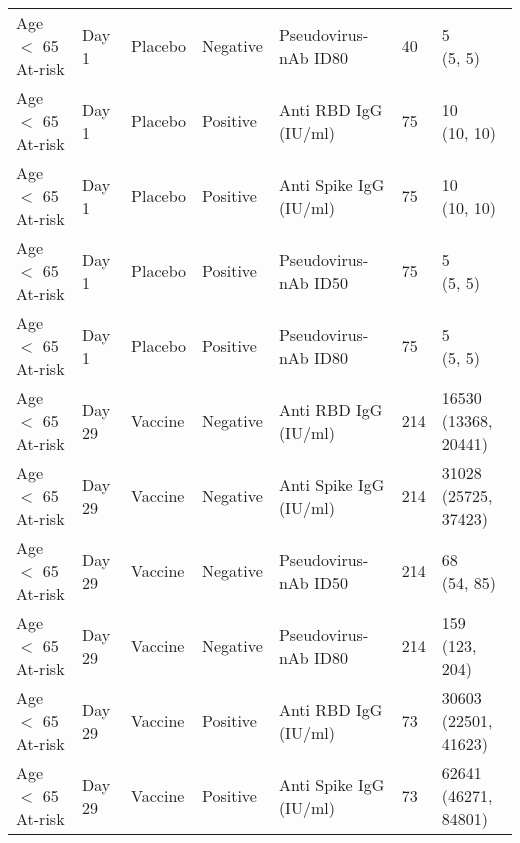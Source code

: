 \documentclass[]{book}
\theoremstyle{definition}
\theoremstyle{definition}
\theoremstyle{definition}
\newcommand{\1}{\mathbbm{1}}
\begin{document}
\begin{landscape}
\begin{ThreePartTable}
\begin{longtable}[t]{>{\raggedright\arraybackslash}p{7cm}llllll}
\hspace{1em}Age $<$ 65 At-risk & Day 1 & Placebo & Negative & Pseudovirus-nAb ID80 & 40 & \makecell[l]{5\\(5, 5)}\\
\hspace{1em}Age $<$ 65 At-risk & Day 1 & Placebo & Positive & Anti RBD IgG (IU/ml) & 75 & \makecell[l]{10\\(10, 10)}\\
\hspace{1em}Age $<$ 65 At-risk & Day 1 & Placebo & Positive & Anti Spike IgG (IU/ml) & 75 & \makecell[l]{10\\(10, 10)}\\
\hspace{1em}Age $<$ 65 At-risk & Day 1 & Placebo & Positive & Pseudovirus-nAb ID50 & 75 & \makecell[l]{5\\(5, 5)}\\
\hspace{1em}Age $<$ 65 At-risk & Day 1 & Placebo & Positive & Pseudovirus-nAb ID80 & 75 & \makecell[l]{5\\(5, 5)}\\
\hspace{1em}Age $<$ 65 At-risk & Day 29 & Vaccine & Negative & Anti RBD IgG (IU/ml) & 214 & \makecell[l]{16530\\(13368, 20441)}\\
\hspace{1em}Age $<$ 65 At-risk & Day 29 & Vaccine & Negative & Anti Spike IgG (IU/ml) & 214 & \makecell[l]{31028\\(25725, 37423)}\\
\hspace{1em}Age $<$ 65 At-risk & Day 29 & Vaccine & Negative & Pseudovirus-nAb ID50 & 214 & \makecell[l]{68\\(54, 85)}\\
\hspace{1em}Age $<$ 65 At-risk & Day 29 & Vaccine & Negative & Pseudovirus-nAb ID80 & 214 & \makecell[l]{159\\(123, 204)}\\
\hspace{1em}Age $<$ 65 At-risk & Day 29 & Vaccine & Positive & Anti RBD IgG (IU/ml) & 73 & \makecell[l]{30603\\(22501, 41623)}\\
\hspace{1em}Age $<$ 65 At-risk & Day 29 & Vaccine & Positive & Anti Spike IgG (IU/ml) & 73 & \makecell[l]{62641\\(46271, 84801)}\\

\end{longtable}
\end{ThreePartTable}
\end{landscape}
\end{document}
